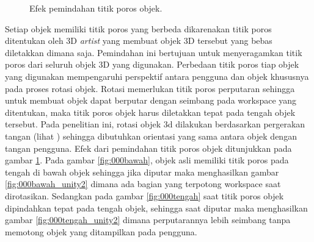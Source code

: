 \begin{figure} [!h]
				\hspace{0.1em}
				\hspace{0.1em}
				\caption{Efek pemindahan titik poros objek.}
				\label{fig:pindahporos}
			\end{figure}
			
			Setiap objek memiliki titik poros yang berbeda dikarenakan titik poros ditentukan oleh 3D \textit{artist} yang membuat objek 3D tersebut yang bebas diletakkan dimana saja. Pemindahan ini bertujuan untuk menyeragamkan titik poros dari seluruh objek 3D yang digunakan. Perbedaan titik poros tiap objek yang digunakan mempengaruhi perspektif antara pengguna dan objek khususnya pada proses rotasi objek. Rotasi memerlukan titik poros perputaran sehingga untuk membuat objek dapat berputar dengan seimbang pada workspace yang ditentukan, maka titik poros objek harus diletakkan tepat pada tengah objek tersebut. Pada penelitian ini, rotasi objek 3d dilakukan berdasarkan pergerakan tangan (lihat ) sehingga dibutuhkan orientasi yang sama antara objek dengan tangan pengguna. Efek dari pemindahan titik poros objek ditunjukkan pada gambar \ref{fig:pindahporos}. Pada gambar \ref{fig:000bawah}, objek asli memiliki titik poros pada tengah di bawah objek sehingga jika diputar maka menghasilkan gambar \ref{fig:000bawah_unity2} dimana ada bagian yang terpotong workspace saat dirotasikan. Sedangkan pada gambar \ref{fig:000tengah} saat titik poros objek dipindahkan  tepat pada tengah objek, sehingga saat diputar maka menghasilkan gambar \ref{fig:000tengah_unity2} dimana perputarannya lebih seimbang tanpa memotong objek yang ditampilkan pada pengguna.
			
